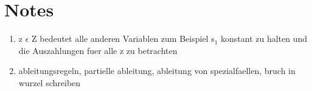 \documentclass[11pt]{article}
\begin{document}
\section{Notes}
\label{sec:orgd177f5e}
\begin{enumerate}
\item z \(\epsilon\) Z bedeutet alle anderen Variablen zum Beispiel s\(_{\text{1}}\) konstant zu halten und die Auszahlungen fuer alle z zu betrachten
\item ableitungsregeln, partielle ableitung, ableitung von spezialfaellen, bruch in wurzel schreiben
\end{enumerate}
\end{document}
